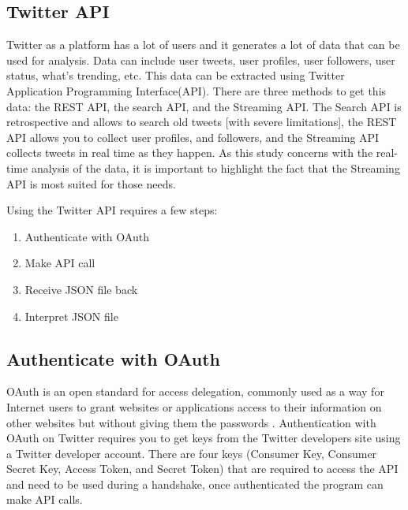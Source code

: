 \subsection{Twitter API}\label{ch1:opts}

Twitter as a platform has a lot of users and it generates a lot of data that can be used for analysis. Data can include user tweets, user profiles, user followers, user status, what's trending, etc. This data can be extracted using Twitter Application Programming Interface(API). There are three methods to get this data: the REST API, the search API, and the Streaming API. The Search API is retrospective and allows to search old tweets [with severe limitations], the REST API allows you to collect user profiles, and followers, and the Streaming API collects tweets in real time as they happen. As this study concerns with the real-time analysis of the data, it is important to highlight the fact that the Streaming API is most suited for those needs.

Using the Twitter API requires a few steps:

\begin{enumerate}
  \item Authenticate with OAuth
  \item Make API call
  \item Receive JSON file back
  \item Interpret JSON file
\end{enumerate}

\subsection{Authenticate with OAuth}

OAuth is an open standard for access delegation, commonly used as a way for Internet users to grant websites or applications access to their information on other websites but without giving them the passwords \cite{gordonunderstanding}. Authentication with OAuth on Twitter requires you to get keys from the Twitter developers site using a Twitter developer account. There are four keys (Consumer Key, Consumer Secret Key, Access Token, and Secret Token) that are required to access the API and need to be used during a handshake, once authenticated the program can make API calls.

%


